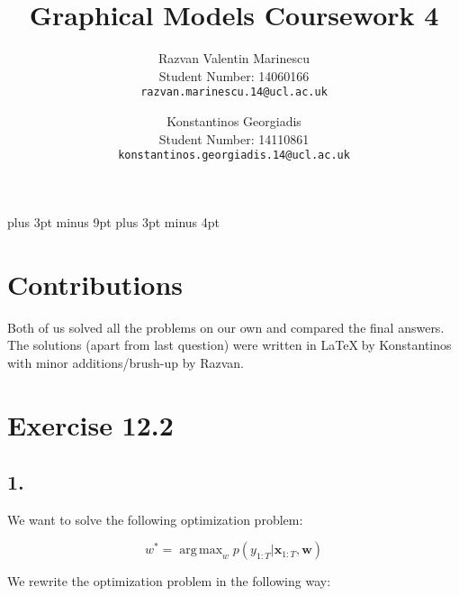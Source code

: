 \documentclass[11pt,a4paper,oneside]{report}
\title{Graphical Models Coursework 4}
\author{
Razvan Valentin Marinescu\\
Student Number: 14060166\\
\texttt{razvan.marinescu.14@ucl.ac.uk}
\and
Konstantinos Georgiadis\\
Student Number: 14110861\\
\texttt{konstantinos.georgiadis.14@ucl.ac.uk}
}
\DeclareMathOperator*{\argmax}{arg\,max}
\begin{document}
\belowdisplayskip=12pt plus 3pt minus 9pt
\belowdisplayshortskip=7pt plus 3pt minus 4pt
\maketitle{}

\section*{Contributions}

Both of us solved all the problems on our own and compared the final answers. The solutions (apart from last question) were written in \LaTeX $\;$by Konstantinos with minor additions/brush-up by Razvan. 

\section*{Exercise 12.2}

\subsection*{1.}

We want to solve the following optimization problem:

$$w^\ast=\argmax_{w}p(y_{1:T}|\mathbf{x}_{1:T},\mathbf{w})$$

We rewrite the optimization problem in the following way:
\end{document}
